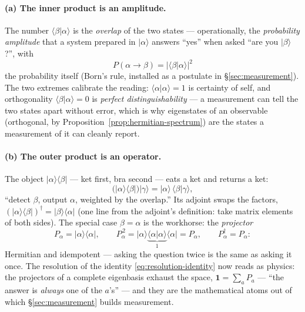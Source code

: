 \documentclass[11pt]{article}
\theoremstyle{plain}
\theoremstyle{definition}
\theoremstyle{remark}
\newcommand{\idop}{\mathbf{1}}  %
\newcommand{\ket}[1]{\lvert #1 \rangle}
\newcommand{\bra}[1]{\langle #1 \rvert}
\newcommand{\braket}[2]{\langle #1 | #2 \rangle}
\begin{document}
\paragraph{(a) The inner product is an amplitude.} The number
$\braket\beta\alpha$ is the \emph{overlap} of the two states ---
operationally, the \emph{probability amplitude} that a system
prepared in $\ket\alpha$ answers ``yes'' when asked ``are you
$\ket\beta$?'', with
\begin{equation}
  P(\alpha \to \beta) = \bigl|\braket\beta\alpha\bigr|^{2}
  \label{eq:born-preview}
\end{equation}
the probability itself (Born's rule, installed as a postulate in
\S\ref{sec:measurement}). The two extremes calibrate the reading:
$\braket\alpha\alpha = 1$ is certainty of self, and orthogonality
$\braket\beta\alpha = 0$ is \emph{perfect distinguishability} --- a
measurement can tell the two states apart without error, which is
why eigenstates of an observable (orthogonal, by
Proposition~\ref{prop:hermitian-spectrum}) are the states a
measurement of it can cleanly report.

\paragraph{(b) The outer product is an operator.} The object
$\ket\alpha\bra\beta$ --- ket first, bra second --- eats a ket and
returns a ket:
\begin{equation}
  \bigl(\ket\alpha\bra\beta\bigr)\ket\gamma
  = \ket\alpha\,\braket\beta\gamma ,
\end{equation}
``detect $\beta$, output $\alpha$, weighted by the overlap.'' Its
adjoint swaps the factors,
$(\ket\alpha\bra\beta)^\dagger = \ket\beta\bra\alpha$ (one line from
the adjoint's definition: take matrix elements of both sides). The
special case $\beta = \alpha$ is the workhorse: the
\emph{projector}
\begin{equation}
  P_\alpha = \ket\alpha\bra\alpha,
  \qquad
  P_\alpha^{\,2}
  = \ket\alpha\underbrace{\braket\alpha\alpha}_{1}\bra\alpha
  = P_\alpha,
  \qquad
  P_\alpha^\dagger = P_\alpha :
\end{equation}
Hermitian and idempotent --- asking the question twice is the same
as asking it once. The resolution of the identity
\eqref{eq:resolution-identity} now reads as physics: the projectors
of a complete eigenbasis exhaust the space,
$\idop = \sum_a P_a$ --- ``the answer is \emph{always} one of the
$a$'s'' --- and they are the mathematical atoms out of which
\S\ref{sec:measurement} builds measurement.
\end{document}
